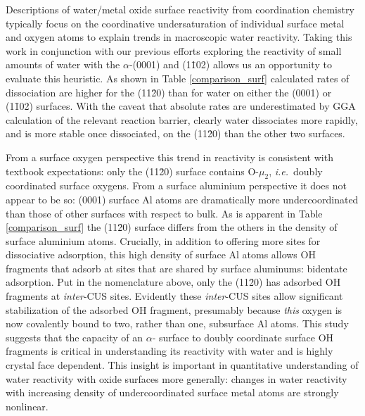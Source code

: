 \documentclass[twoside,twocolumn,9pt]{article}
\begin{document}
Descriptions of water/metal oxide surface reactivity from coordination chemistry typically focus on the coordinative undersaturation of individual surface metal and oxygen atoms to explain trends in macroscopic water reactivity. Taking this work in conjunction with our previous efforts exploring the reactivity of small amounts of water with the $\alpha$-(0001) and (1\=102) allows us an opportunity to evaluate this heuristic. As shown in Table \ref{comparison_surf} calculated rates of  dissociation are higher for the (11\=20) than for water on either the (0001) or (1\=102) surfaces. With the caveat that absolute rates are underestimated by GGA calculation of the relevant reaction barrier, clearly water dissociates more rapidly, and is more stable once dissociated, on the (11\=20) than the other two surfaces. 

From a surface oxygen perspective this trend in reactivity is consistent with textbook expectations: only the (11\=20) surface contains O-$\mu_2$, \textit{i.e.}\ doubly coordinated surface oxygens. From a surface aluminium perspective it does not appear to be so: (0001) surface Al atoms are dramatically more undercoordinated than those of other surfaces with respect to bulk. As is apparent in Table \ref{comparison_surf} the (11\=20) surface differs from the others in the density of surface aluminium atoms. Crucially, in addition to offering more sites for dissociative adsorption, this high density of surface Al atoms allows OH fragments that adsorb at sites that are shared by surface aluminums: bidentate adsorption. Put in the nomenclature above, only the (11\=20) has adsorbed OH fragments at {\it{inter}}-CUS sites. Evidently these {\it{inter}}-CUS sites allow significant stabilization of the adsorbed OH fragment, presumably because {\it this} oxygen is now covalently bound to two, rather than one, subsurface Al atoms. This study suggests that the capacity of an $\alpha$- surface to doubly coordinate surface OH fragments is critical in understanding its reactivity with water and is highly crystal face dependent. This insight is important in quantitative understanding of water reactivity with oxide surfaces more generally: changes in water reactivity with increasing density of undercoordinated surface metal atoms are strongly nonlinear. 

 


%
\end{document}

